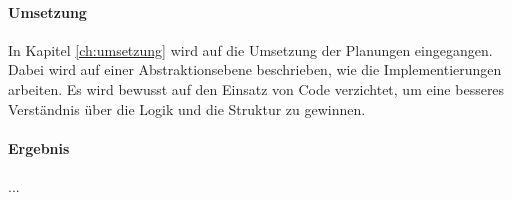 \paragraph{Umsetzung} In Kapitel \ref{ch:umsetzung} wird auf die Umsetzung der Planungen eingegangen. Dabei wird auf einer Abstraktionsebene beschrieben, wie die Implementierungen arbeiten. Es wird bewusst auf den Einsatz von Code verzichtet, um eine besseres Verständnis über die Logik und die Struktur zu gewinnen. 

\paragraph{Ergebnis}  ...

